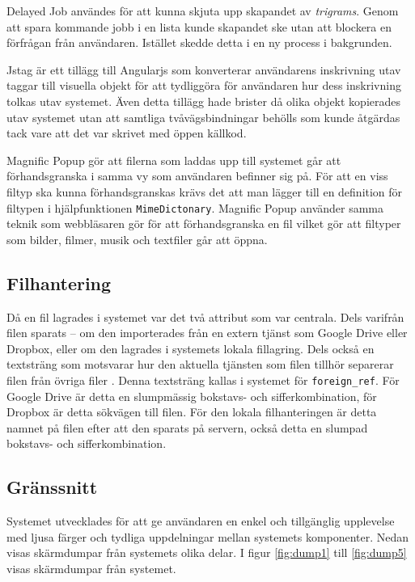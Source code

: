Delayed Job användes för att kunna skjuta upp skapandet av \emph{trigrams}.
Genom att spara kommande jobb i en lista kunde skapandet ske utan att blockera
en förfrågan från användaren. Istället skedde detta i en ny process i
bakgrunden.

Jstag är ett tillägg till Angularjs som konverterar användarens inskrivning
utav taggar till visuella objekt för att tydliggöra för användaren hur dess
inskrivning tolkas utav systemet. Även detta tillägg hade brister då olika
objekt kopierades utav systemet utan att samtliga tvåvägsbindningar behölls som
kunde åtgärdas tack vare att det var skrivet med öppen källkod.

Magnific Popup gör att filerna som laddas upp till systemet går att
förhandsgranska i samma vy som användaren befinner sig på. För att en viss
filtyp ska kunna förhandsgranskas krävs det att man lägger till en definition
för filtypen i hjälpfunktionen \texttt{MimeDictonary}. Magnific Popup använder
samma teknik som webbläsaren gör för att förhandsgranska en fil vilket gör att
filtyper som bilder, filmer, musik och textfiler går att öppna.

\subsection{Filhantering}

Då en fil lagrades i systemet var det två attribut som var centrala. Dels
varifrån filen sparats – om den importerades från en extern tjänst som Google
Drive eller Dropbox, eller om den lagrades i systemets lokala fillagring. Dels
också en textsträng som motsvarar hur den aktuella tjänsten som filen tillhör
separerar filen från övriga filer . Denna textsträng kallas i systemet för
\texttt{foreign\_ref}. För Google Drive är detta en slumpmässig bokstavs- och
sifferkombination, för Dropbox är detta sökvägen till filen. För den lokala
filhanteringen är detta namnet på filen efter att den sparats på servern, också
detta en slumpad bokstavs- och sifferkombination.

\subsection{Gränssnitt}

Systemet utvecklades för att ge användaren en enkel och tillgänglig upplevelse
med ljusa färger och tydliga uppdelningar mellan systemets komponenter. Nedan
visas skärmdumpar från systemets olika delar. I figur \ref{fig:dump1} till
\ref{fig:dump5} visas skärmdumpar från systemet.

